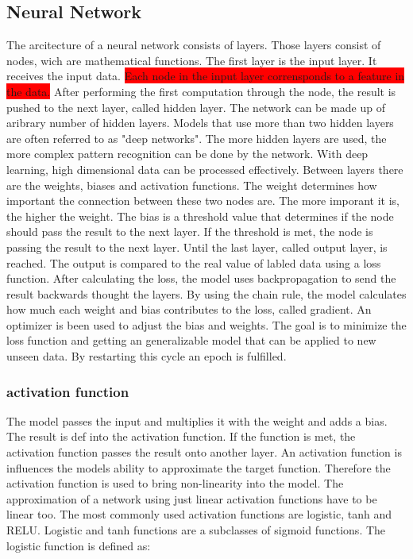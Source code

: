 \subsection{Neural Network}
The arcitecture of a neural network consists of layers. 
Those layers consist of nodes, wich are mathematical functions.
The first layer is the input layer. 
It receives the input data. \colorbox{red}{Each node in the input layer corrensponds to a feature in the data.}
After performing the first computation through the node, the result is pushed to the next layer, called hidden layer.
The network can be made up of aribrary number of hidden layers. 
Models that use more than two hidden layers are often referred to as "deep networks".
The more hidden layers are used, the more complex pattern recognition can be done by the network.
With deep learning, high dimensional data can be processed effectively.
Between layers there are the weights, biases and activation functions. 
The weight determines how important the connection between these two nodes are. 
The more imporant it is, the higher the weight. 
The bias is a threshold value that determines if the node should pass the result to the next layer.
If the threshold is met, the node is passing the result to the next layer.
Until the last layer, called  output layer, is reached.
The output is compared to the real value of labled data using a loss function. 
After calculating the loss, the model uses backpropagation to send the result backwards thought the layers.  
By using the chain rule, the model calculates how much each weight and bias contributes to the loss, called gradient.
An optimizer is been used to adjust the bias and weights. 
The goal is to minimize the loss function and getting an generalizable model that can be applied to new unseen data.
By restarting this cycle an epoch is fulfilled. 



\subsubsection{activation function}

The model passes the input and multiplies it with the weight and adds a bias. 
The result is def into the activation function. If the function is met, the activation function passes the result onto another layer.
An activation function is influences the models ability to approximate the target function.
Therefore the activation function is used to bring non-linearity into the model.
The approximation of a network using just linear activation functions have to be linear too.
The most commonly used activation functions are logistic, tanh and RELU.
Logistic and tanh functions are a subclasses of sigmoid functions.
The logistic function is defined as: 

